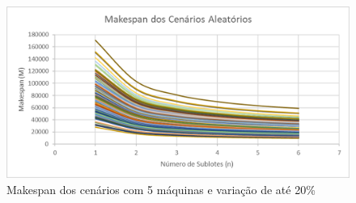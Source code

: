 \begin{figure}[!ht]
    \centering
    \includegraphics[width=12cm]{Resultados/Figuras/M05_20}
    \caption{Makespan dos cenários com 5 máquinas e variação de até 20\%}
    \label{fig:M05_20}
\end{figure}